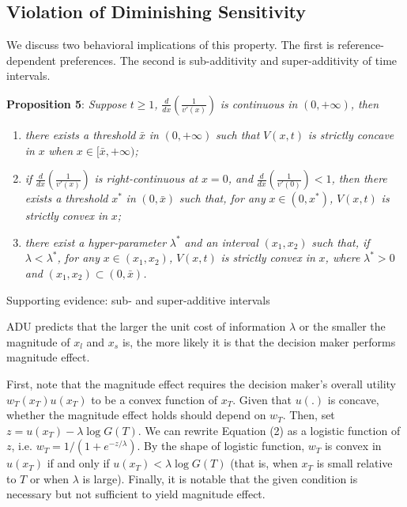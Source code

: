 \documentclass[
  12pt,
]{article}
\begin{document}
\hypertarget{violation-of-diminishing-sensitivity}{%
\subsection{Violation of Diminishing
Sensitivity}\label{violation-of-diminishing-sensitivity}}

We discuss two behavioral implications of this property. The first is
reference-dependent preferences. The second is sub-additivity and
super-additivity of time intervals.

\textbf{Proposition 5}: \emph{Suppose} \(t\geq1\)\emph{,}
\(\frac{d}{dx}\left(\frac{1}{v'(x)}\right)\) \emph{is continuous in}
\((0,+\infty)\)\emph{, then}

\begin{enumerate}
\def\labelenumi{\arabic{enumi})}
\item
  \emph{there exists a threshold} \(\bar{x}\) \emph{in} \((0,+\infty)\)
  \emph{such that} \(V(x,t)\) \emph{is strictly concave in} \(x\)
  \emph{when} \(x\in [\bar{x},+\infty)\)\emph{;}
\item
  \emph{if} \(\frac{d}{dx}\left(\frac{1}{v'(x)}\right)\) \emph{is
  right-continuous at} \(x=0\)\emph{, and}
  \(\frac{d}{dx}\left(\frac{1}{v'(0)}\right)<1\)\emph{, then there
  exists a threshold} \(x^*\) \emph{in} \((0, \bar{x})\) \emph{such
  that, for any} \(x\in (0,x^*)\)\emph{,} \(V(x,t)\) \emph{is strictly
  convex in} \(x\)\emph{;}
\item
  \emph{there exist a hyper-parameter} \(\lambda^*\) \emph{and an
  interval} \((x_1,x_2)\) \emph{such that, if}
  \(\lambda<\lambda^*\)\emph{, for any} \(x\in(x_1,x_2)\)\emph{,}
  \(V(x,t)\) \emph{is strictly convex in} \(x\)\emph{, where}
  \(\lambda^*>0\) \emph{and} \((x_1,x_2)\subset(0,\bar{x})\)\emph{.}
\end{enumerate}

Supporting evidence: sub- and super-additive intervals

ADU predicts that the larger the unit cost of information \(\lambda\) or
the smaller the magnitude of \(x_l\) and \(x_s\) is, the more likely it
is that the decision maker performs magnitude effect.

First, note that the magnitude effect requires the decision maker's
overall utility \(w_T(x_T)u(x_T)\) to be a convex function of \(x_T\).
Given that \(u(.)\) is concave, whether the magnitude effect holds
should depend on \(w_T\). Then, set \(z = u(x_T)-\lambda\log G(T)\). We
can rewrite Equation (2) as a logistic function of \(z\), i.e.
\(w_T = 1/(1+e^{-z/\lambda})\). By the shape of logistic function,
\(w_T\) is convex in \(u(x_T)\) if and only if
\(u(x_T)<\lambda \log G(T)\) (that is, when \(x_T\) is small relative to
\(T\) or when \(\lambda\) is large). Finally, it is notable that the
given condition is necessary but not sufficient to yield magnitude
effect.
\end{document}
